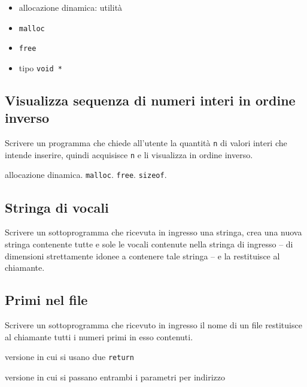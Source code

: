 \begin{itemize}
\item allocazione dinamica: utilit\`a
\item \texttt{malloc}
\item \texttt{free}
\item tipo \texttt{void *}
\end{itemize}

\subsection{Visualizza sequenza di numeri interi in ordine inverso}
Scrivere un programma che chiede all'utente la quantit\`a \texttt{n} di valori interi che intende inserire, quindi acquisisce \texttt{n} e li visualizza in ordine inverso.

\begin{tags}
allocazione dinamica. \texttt{malloc}. \texttt{free}. \texttt{sizeof}.
\end{tags}


\subsection{Stringa di vocali}
Scrivere un sottoprogramma che ricevuta in ingresso una stringa, crea una nuova stringa contenente tutte e sole le vocali contenute nella stringa di ingresso -- di dimensioni strettamente idonee a contenere tale stringa -- e la restituisce al chiamante.



\subsection{Primi nel file}
Scrivere un sottoprogramma che ricevuto in ingresso il nome di un file restituisce al chiamante tutti i numeri primi in esso contenuti.


versione in cui si usano due \texttt{return}


versione in cui si passano entrambi i parametri per indirizzo

